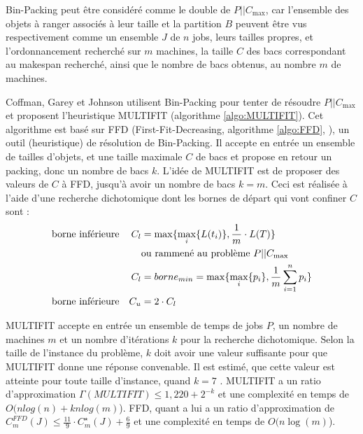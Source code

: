 \documentclass[a4paper,12pt]{report}
\theoremstyle{plain}				%
\theoremstyle{definition}				%
\newcommand\problemGrahamP{$P||C_{\max}$\xspace}
\begin{document}
Bin-Packing peut être considéré comme le double de \problemGrahamP, 
  car l'ensemble des objets à ranger associés à leur taille et la partition $B$ 
  peuvent être vus respectivement comme 
  un ensemble $J$ de $n$ jobs, leurs tailles propres, 
  et l'ordonnancement recherché sur $m$ machines,
  la taille $C$ des bacs correspondant au makespan recherché, 
  ainsi que le nombre de bacs obtenus, au nombre $m$ de machines.
  
\bigskip
Coffman, Garey et Johnson \cite{coffman1978application} utilisent Bin-Packing 
  pour tenter de résoudre \problemGrahamP et proposent 
  l'heuristique MULTIFIT (algorithme \ref{algo:MULTIFIT}). 
Cet algorithme est basé sur FFD 
  (First-Fit-Decreasing, algorithme \ref{algo:FFD}, \cite{rieck2021basic}), 
  un outil (heuristique) de résolution de Bin-Packing. 
Il accepte en entrée un ensemble de tailles d'objets, et une taille maximale $C$ de bacs 
  et propose en retour un packing, donc un nombre de bacs $k$.
L'idée de MULTIFIT est de proposer des valeurs de $C$ à FFD, jusqu'à avoir un nombre de bacs $k=m$.
Ceci est réalisée à l'aide d'une recherche dichotomique dont les bornes de départ qui vont confiner $C$ sont : 
\begin{align*}
&\textnormal{borne inférieure} 	&C_l 	&= \max \{ \max_i \{ L(t_i) \}, \frac{1}{m} \cdot L(T) \} \\
& 								& 		& \textnormal{ou rammené au problème \problemGrahamP} \\	 
& 								& C_l 	&= borne_{min} = \max \{ \max_i\{p_i\}, \frac{1}{m} \sum_{i=1}^{n} p_i \} \\
&\textnormal{borne inférieure} 	&C_u 	&= 2 \cdot C_l 
\end{align*}

MULTIFIT accepte en entrée un ensemble de temps de jobs $P$, 
  un nombre de machines $m$ et 
  un nombre d'itérations $k$ pour la recherche dichotomique.
Selon la taille de l'instance du problème, $k$ doit avoir une valeur suffisante pour que 
  MULTIFIT donne une réponse convenable. 
Il est estimé, que cette valeur est atteinte pour toute taille d'instance, 
  quand $k=7$ \cite{coffman1978application}.
MULTIFIT a 
  un ratio d'approximation $\Gamma(MULTIFIT) \leq 1,220 + 2^{-k}$ et 
  une complexité en temps de $ O(n log(n) + kn log(m)$).
FFD, quant a lui a 
  un ratio d'approximation de $C_m^{FFD}(J) \leq \frac{11}{9} \cdot C_m^\star(J) + \frac{6}{9}$ 
  \cite{dosa2007tight} et une complexité en temps de $ O(n \log(m)$).
\end{document}
